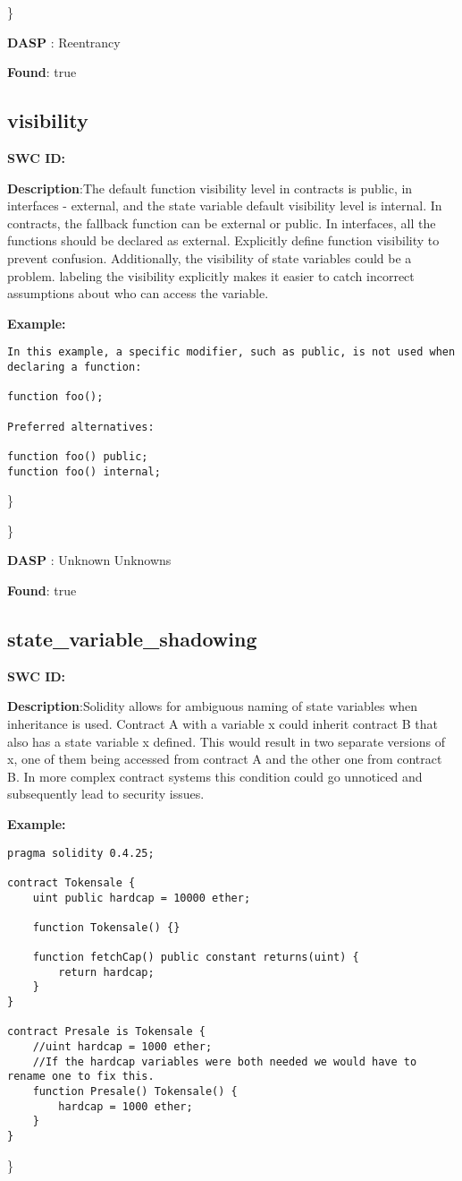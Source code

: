 \documentclass{article}
\begin{document}
\} 

\textbf{DASP} : Reentrancy

\textbf{Found}: true

\subsection{visibility} 
\textbf{SWC \textunderscore ID:} 

\textbf{Description}:The default function visibility level in contracts is public, in interfaces - external,  and the state variable default visibility level is internal. In contracts, the fallback function can be external or public. In interfaces, all the functions should be declared as external. Explicitly define function visibility to prevent confusion.
Additionally, the visibility of state variables could be a problem. labeling the visibility explicitly makes it easier to catch incorrect assumptions about who can access the variable.


\textbf{Example:} 
\begin{verbatim}
In this example, a specific modifier, such as public, is not used when declaring a function:

function foo();

Preferred alternatives:

function foo() public;
function foo() internal;

\end{verbatim}\} 

\} 

\textbf{DASP} : Unknown Unknowns

\textbf{Found}: true

\subsection{state\_variable\_shadowing} 
\textbf{SWC \textunderscore ID:} 

\textbf{Description}:Solidity allows for ambiguous naming of state variables when inheritance is used. Contract A with a variable x could inherit contract B that also has a state variable x defined. This would result in two separate versions of x, one of them being accessed from contract A and the other one from contract B. In more complex contract systems this condition could go unnoticed and subsequently lead to security issues.


\textbf{Example:} 
\begin{verbatim}
pragma solidity 0.4.25;

contract Tokensale {
    uint public hardcap = 10000 ether;

    function Tokensale() {}

    function fetchCap() public constant returns(uint) {
        return hardcap;
    }
}

contract Presale is Tokensale {
    //uint hardcap = 1000 ether;
    //If the hardcap variables were both needed we would have to rename one to fix this.
    function Presale() Tokensale() {
        hardcap = 1000 ether;
    }
}

\end{verbatim}\} 
\end{document}
